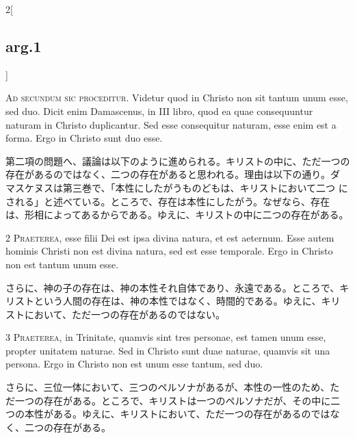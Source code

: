 \documentclass[paper=a4paper,fontsize=10pt,jafontsize=9pt,titlepage]{jlreq}
\begin{document}
\begin{paracol}{2}[\subsection{arg.1}]

{\Huge A}{\scshape d secundum sic proceditur}. Videtur quod
 in Christo non sit tantum unum esse, sed duo. Dicit enim Damascenus, in
 III libro, quod ea quae consequuntur naturam in Christo
 duplicantur. Sed esse consequitur naturam, esse enim est a forma. Ergo
 in Christo sunt duo esse.

\switchcolumn

第二項の問題へ、議論は以下のように進められる。キリストの中に、ただ一つの
 存在があるのではなく、二つの存在があると思われる。理由は以下の通り。ダ
 マスケヌスは第三巻で、「本性にしたがうものどもは、キリストにおいて二つ
 にされる」と述べている。ところで、存在は本性にしたがう。なぜなら、存在
 は、形相によってあるからである。ゆえに、キリストの中に二つの存在がある。


{\scshape 2 Praeterea}, esse filii Dei est ipsa divina
 natura, et est aeternum. Esse autem hominis Christi non est divina
 natura, sed est esse temporale. Ergo in Christo non est tantum unum
 esse.

\switchcolumn

さらに、神の子の存在は、神の本性それ自体であり、永遠である。ところで、キ
 リストという人間の存在は、神の本性ではなく、時間的である。ゆえに、キリ
 ストにおいて、ただ一つの存在があるのではない。


{\scshape 3 Praeterea}, in Trinitate, quamvis sint
 tres personae, est tamen unum esse, propter unitatem naturae. Sed in
 Christo sunt duae naturae, quamvis sit una persona. Ergo in Christo non
 est unum esse tantum, sed duo.

\switchcolumn

さらに、三位一体において、三つのペルソナがあるが、本性の一性のため、た
だ一つの存在がある。ところで、キリストは一つのペルソナだが、その中に二
つの本性がある。ゆえに、キリストにおいて、ただ一つの存在があるのではな
く、二つの存在がある。


\end{paracol}
\end{document}
